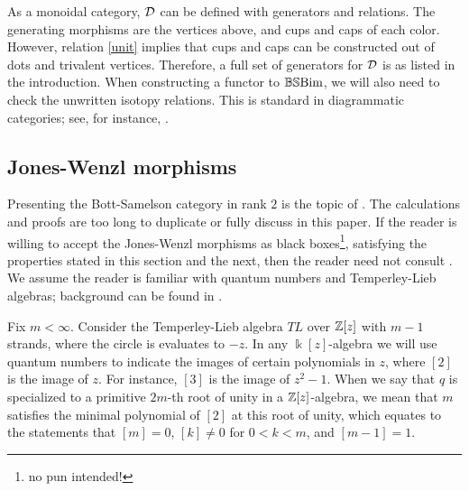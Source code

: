 \begin{remark} \label{generatorsinorder} As a monoidal category, ${\mathcal{D}}$ can be defined with generators and relations. The generating morphisms are the vertices above, and cups and caps of
each color. However, relation \eqref{unit} implies that cups and caps can be constructed out of dots and trivalent vertices. Therefore, a full set of generators for ${\mathcal{D}}$ is as listed in the introduction. 
When constructing a functor to $\mathbb{BS}\textrm{Bim}$, we will also need to check the unwritten isotopy relations. This is standard in diagrammatic categories; see, for instance, \cite{Lauda}. \end{remark}

\subsection{Jones-Wenzl morphisms} \label{subsec-JW}

Presenting the Bott-Samelson category in rank $2$ is the topic of \cite{EDihedral}. The calculations and proofs are too long to duplicate or fully discuss in this paper. If the reader is
willing to accept the Jones-Wenzl morphisms as black boxes\footnote{no pun intended!}, satisfying the properties stated in this section and the next, then the reader need not consult
\cite{EDihedral}. We assume the reader is familiar with quantum numbers and Temperley-Lieb algebras; background can be found in \cite{EDihedral}.

Fix $m<\infty$. Consider the Temperley-Lieb algebra $TL$ over ${\mathbb{Z}}[z]$ with $m-1$ strands, where the circle is evaluates to $-z$. In any $\Bbbk[z]$-algebra we will use quantum
numbers to indicate the images of certain polynomials in $z$, where $[2]$ is the image of $z$. For instance, $[3]$ is the image of $z^2-1$. When we say that $q$ is specialized to a
primitive $2m$-th root of unity in a ${\mathbb{Z}}[z]$-algebra, we mean that $m$ satisfies the minimal polynomial of $[2]$ at this root of unity, which equates to the statements that $[m]=0$, $[k]\ne 0$ for $0< k < m$, and $[m-1]=1$.

